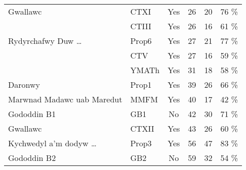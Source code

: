 \begin{table}[]
\begin{tabular}{@{}llcrrr@{}}
Gwallawc                          & CTXI           & Yes                                      & 26                                       & 20                                   & 76                                   \% \\
                                  & CTIII          & Yes                                      & 26                                       & 16                                   & 61                                   \% \\
Rydyrchafwy Duw \ldots & Prop6          & Yes                                      & 27                                       & 21                                   & 77                                   \% \\
                                  & CTV            & Yes                                      & 27                                       & 16                                   & 59                                   \% \\
                                  & YMATh          & Yes                                      & 31                                       & 18                                   & 58                                   \% \\
Daronwy                           & Prop1          & Yes                                      & 39                                       & 26                                   & 66                                   \% \\
Marwnad Madawc uab Maredut        & MMFM           & Yes                                      & 40                                       & 17                                   & 42                                   \% \\
Gododdin B1                       & GB1            & No                                     & 42                                       & 30                                   & 71                                   \% \\
Gwallawc                          & CTXII          & Yes                                      & 43                                       & 26                                   & 60                                   \% \\
Kychwedyl a'm dodyw \ldots  & Prop3          & Yes                                      & 56                                       & 47                                   & 83                                   \% \\
Gododdin B2                       & GB2            & No                                     & 59                                       & 32                                   & 54                                   \% \\

\end{tabular}
\end{table}
